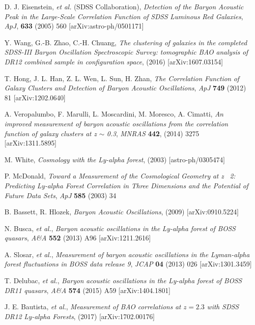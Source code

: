 \documentclass[a4paper,11pt]{article}
\begin{document}
\begin{thebibliography}{99}
D. J. Eisenstein, {\it et al.} (SDSS Collaboration), 
\emph{Detection of the Baryon Acoustic Peak in the Large-Scale Correlation Function of SDSS 
Luminous Red Galaxies},
\emph{ApJ}, 
{\bf 633} 
(2005)
560
[arXiv:astro-ph/0501171]

Y. Wang, G.-B. Zhao, C.-H. Chuang, 
\emph{The clustering of galaxies in the completed SDSS-III Baryon Oscillation Spectroscopic Survey: 
tomographic BAO analysis of DR12 combined sample in configuration space},
(2016)
[arXiv:1607.03154]

T. Hong, J. L. Han, Z. L. Wen, L. Sun, H. Zhan, 
\emph{The Correlation Function of Galaxy Clusters and Detection of Baryon Acoustic Oscillations},
\emph{ApJ} 
{\bf 749} 
(2012)
81 
[arXiv:1202.0640]

A. Veropalumbo, F. Marulli, L. Moscardini, M. Moresco, A. Cimatti,  
\emph{An improved measurement of baryon acoustic oscillations from the correlation function of galaxy 
clusters at z $\sim$ 0.3},
\emph{MNRAS} 
{\bf 442}, 
(2014)
3275 
[arXiv:1311.5895]

M. White,  
\emph{Cosmology with the Ly-alpha forest}, 
(2003)
[astro-ph/0305474]

P. McDonald,  
\emph{Toward a Measurement of the Cosmological Geometry at z~ 2: 
Predicting Ly-alpha Forest Correlation in Three Dimensions and the Potential of Future Data Sets}, 
\emph{ApJ} 
{\bf 585}
(2003)
34 

B. Bassett, R. Hlozek, 
\emph{Baryon Acoustic Oscillations}, 
(2009)
[arXiv:0910.5224]

N. Busca, {\it et al.}, 
\emph{Baryon acoustic oscillations in the Ly-alpha forest of BOSS quasars},
\emph{A\&A} 
{\bf 552} 
(2013)
A96
[arXiv:1211.2616]

A. Slosar, {\it et al.}, 
\emph{Measurement of baryon acoustic oscillations in the Lyman-alpha forest fluctuations in BOSS 
data release 9}, 
\emph{JCAP} 
{\bf 04}
(2013) 
026
[arXiv:1301.3459]

T. Delubac, {\it et al.}, 
\emph{Baryon acoustic oscillations in the Ly-alpha forest of BOSS DR11 quasars}, 
\emph{A\&A} 
{\bf 574}
(2015)
A59
[arXiv:1404.1801]

J. E. Bautista, {\it et al.}, 
\emph{Measurement of BAO correlations at $z=2.3$ with SDSS DR12 Ly-alpha Forests}, 
(2017)
[arXiv:1702.00176]


\end{thebibliography}
\end{document}
